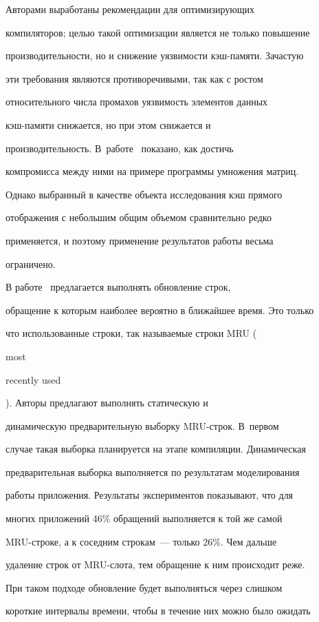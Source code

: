     Авторами выработаны рекомендации для оптимизирующих 

компиляторов; целью такой оптимизации является не только повышение 

производительности, но и снижение уязвимости кэш-памяти. Зачастую 

эти требования являются противоречивыми, так как с ростом 

относительного числа промахов уязвимость элементов данных 

    кэш-памяти снижается, но при этом снижается и 

производительность. В~работе~\cite{5ss} показано, как достичь 

компромисса между ними на примере программы умножения матриц. 

Однако выбранный в качестве объекта исследования кэш прямого 

отображения с небольшим общим объемом сравнительно редко 

применяется, и поэтому применение результатов работы весьма 

ограничено.

    

    В работе~\cite{3ss} предлагается выполнять обновление строк, 

обращение к которым наиболее вероятно в ближайшее время. Это только 

что использованные строки, так называемые строки MRU ({most 

recently used}). Авторы предлагают выполнять статическую и 

динамическую предварительную выборку MRU-строк. В~первом 

случае такая выборка планируется на этапе компиляции. Динамическая 

предварительная выборка выполняется по результатам моделирования 

работы приложения. Результаты экспериментов показывают, что для 

многих приложений 46\% обращений выполняется к той же самой 

MRU-стро\-ке, а к соседним строкам~--- только 26\%. Чем дальше 

удаление строк от MRU-сло\-та, тем обращение к ним происходит реже. 

    

    При таком подходе обновление будет выполняться через слишком 

короткие интервалы времени, чтобы в течение них можно было ожидать 

